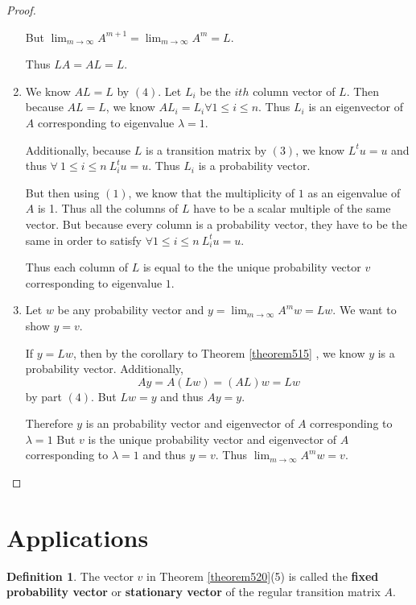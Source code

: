 \documentclass{amsart}
\theoremstyle{definition}
\newtheorem{definition}[thm]{Definition}
\theoremstyle{remark}
\numberwithin{equation}{section}
\begin{document}
\begin{proof}
\begin{enumerate}
			But $\lim_{m \to \infty} A^{m+1} = \lim_{m \to \infty} A^{m} = L$.

			Thus $LA = AL = L$.


	\item 
			We know $AL = L$ by $(4)$.
			Let $L_i$ be the $ith$ column vector of $L$.
			Then because $AL = L$, we know $AL_i = L_i \forall 1 \leq i \leq n$.
			Thus $L_i$ is an eigenvector of $A$ corresponding to eigenvalue $\lambda = 1$.

			Additionally, because $L$ is a transition matrix by $(3)$, we know $L^tu = u$ and thus $\forall\ 1 \leq i \leq n\ L_i^t u = u$.
			Thus $L_i$ is a probability vector.

			But then using $(1)$, we know that the multiplicity of $1$ as an eigenvalue of $A$ is 1.
			Thus all the columns of $L$ have to be a scalar multiple of the same vector.
			But because every column is a probability vector, they have to be the same in order to satisfy $\forall 1 \leq i \leq n\ L_i^t u = u$. 

			Thus each column of $L$ is equal to the the unique probability vector $v$ corresponding to eigenvalue $1$.

	\item 
		Let $w$ be any probability vector and $y = \lim_{m \to \infty} A^m w  = Lw$.
		We want to show $y = v$.
		
		If $y = Lw$, then by the corollary to Theorem \ref{theorem515} , we know $y$ is a probability vector.
		Additionally,
		$$Ay = A(Lw) = (AL)w = Lw$$
		by part $(4)$.
		But $Lw = y$ and thus $Ay = y$.

		Therefore $y$ is an probability vector and eigenvector of $A$ corresponding to $\lambda = 1$
		But $v$ is the unique probability vector and eigenvector of $A$ corresponding to $\lambda = 1$ and thus $y = v$.
		Thus $\lim_{m \to \infty} A^m w = v$.


\end{enumerate}


\end{proof}

\section{Applications}

\begin{definition}
The vector $v$ in Theorem \ref{theorem520}(5) is called the \textbf{fixed probability vector} or \textbf{stationary vector} of the regular transition matrix $A$.

\end{definition}


 
\end{document}
